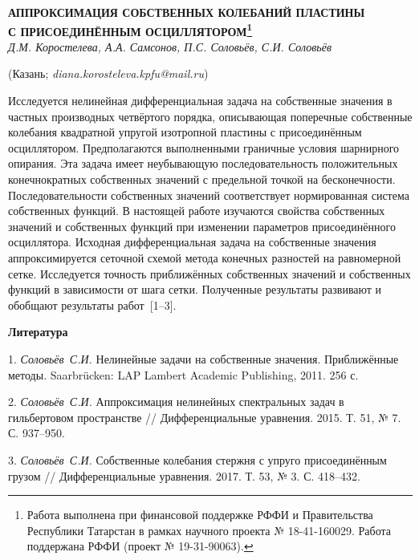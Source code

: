 \begin{center}
    {\bf АППРОКСИМАЦИЯ СОБСТВЕННЫХ КОЛЕБАНИЙ ПЛАСТИНЫ\\ С ПРИСОЕДИНЁННЫМ ОСЦИЛЛЯТОРОМ\footnote{Работа выполнена при финансовой поддержке РФФИ и Правительства Республики Татарстан в рамках научного проекта № 18-41-160029.
Работа поддержана РФФИ (проект № 19-31-90063).}}\\

    {\it Д.М. Коростелева, А.А. Самсонов, П.С. Соловьёв, С.И. Соловьёв}

    (Казань; {\it diana.korosteleva.kpfu@mail.ru})
\end{center}



Исследуется нелинейная дифференциальная задача на собственные значения в частных производных четвёртого порядка,
описывающая поперечные собственные колебания квадратной упругой изотропной пластины с присоединённым осциллятором.
Предполагаются выполненными граничные условия шарнирного опирания.
Эта задача имеет неубывающую последовательность положительных конечнократных собственных значений
с предельной точкой на бесконечности.
Последовательности собственных значений соответствует нормированная система
собственных функций.
В настоящей работе изучаются свойства собственных значений и собственных функций
при изменении параметров присоединённого осциллятора.
Исходная дифференциальная задача на собственные значения аппроксимируется
сеточной схемой метода конечных разностей на равномерной сетке.
Исследуется точность приближённых собственных значений
и собственных функций в зависимости от шага сетки.
Полученные результаты развивают и обобщают результаты работ~[1--3].



\smallskip \centerline {\bf Литература} \nopagebreak

1. {\it Соловьёв~С.И.}
Нелинейные задачи на собственные значения. Приближённые методы.
Saarbr\"ucken: LAP Lambert Academic Publishing, 2011. 256 с.

2. {\it Соловьёв~С.И.}
Аппроксимация нелинейных спектральных задач в гильбертовом пространстве
// Дифференциальные уравнения. 2015. Т. 51,
№ 7. С. 937--950.

3. {\it Соловьёв~С.И.}
Собственные колебания стержня с упруго присоединённым грузом
// Дифференциальные уравнения. 2017. Т. 53,
№ 3. С. 418--432.
